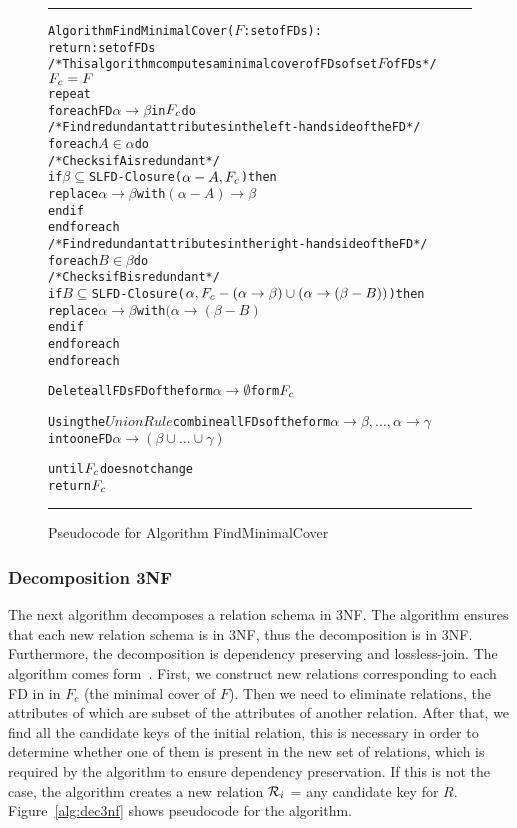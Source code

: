 \begin{figure}[htbp]
\hrule
\vspace{0.25cm}
\begin{alltt}
Algorithm FindMinimalCover(\(F\): set of FDs):
             return: set of FDs
/* This algorithm computes a minimal cover of FDs of set \(F\) of FDs */
  \(F\sb{c} = F\)
  repeat
    foreach FD \(\alpha \rightarrow \beta\) in \(F\sb{c}\) do
      /* Find redundant attributes in the left-hand side of the FD */
      foreach \(A \in \alpha\) do
        /* Checks if A is redundant */
        if \(\beta \subseteq\) SLFD-Closure(\(\alpha-A, F\sb{c}\)) then
          replace \(\alpha \rightarrow \beta\) with \((\alpha-A) \rightarrow \beta\)
        end if
      end foreach
      /* Find redundant attributes in the right-hand side of the FD */
      foreach \(B \in \beta\) do
        /* Checks if B is redundant */
        if \(B \subseteq\) SLFD-Closure(\(\alpha, F\sb{c}-(\alpha \rightarrow \beta) \cup (\alpha \rightarrow (\beta - B))\)) then
          replace \(\alpha \rightarrow \beta\) with \((\alpha \rightarrow (\beta-B)\)
        end if
      end foreach
    end foreach
    
    Delete all FDs FD of the form \(\alpha \rightarrow \emptyset\) form \(F\sb{c}\)
      
    Using the \(Union Rule\) combine all FDs of the form \(\alpha \rightarrow \beta,...,\alpha \rightarrow \gamma\)
      into one FD \(\alpha \rightarrow (\beta \cup ... \cup \gamma)\)
      
  until \(F\sb{c}\) does not change
  return \(F\sb{c}\)
\end{alltt}
\caption{Pseudocode for Algorithm FindMinimalCover}\label{alg:mincov}
\hrule
\end{figure}

\subsubsection{Decomposition 3NF}
The next algorithm decomposes a relation schema in 3NF. The algorithm
ensures that each new relation schema is in 3NF, thus the decomposition is in 3NF. 
Furthermore, the decomposition is dependency preserving and lossless-join. 
The algorithm comes form~\cite[Section 6.8]{bdb2}. 
First, we construct new relations corresponding to each FD in in $F_{c}$ (the minimal cover of $F$). 
Then we need to eliminate relations, the attributes of
which are subset of the attributes of another relation. 
After that, we find all the candidate keys of
the initial relation, this is necessary in order to determine  whether one of them is present
in the new set of relations, which is required by the algorithm to ensure
dependency preservation. If this is not the case, the algorithm creates
a new relation \(\mathcal{R}\sb{i}\) = any candidate key for \(R\).
Figure~\ref{alg:dec3nf} shows pseudocode for the algorithm.

